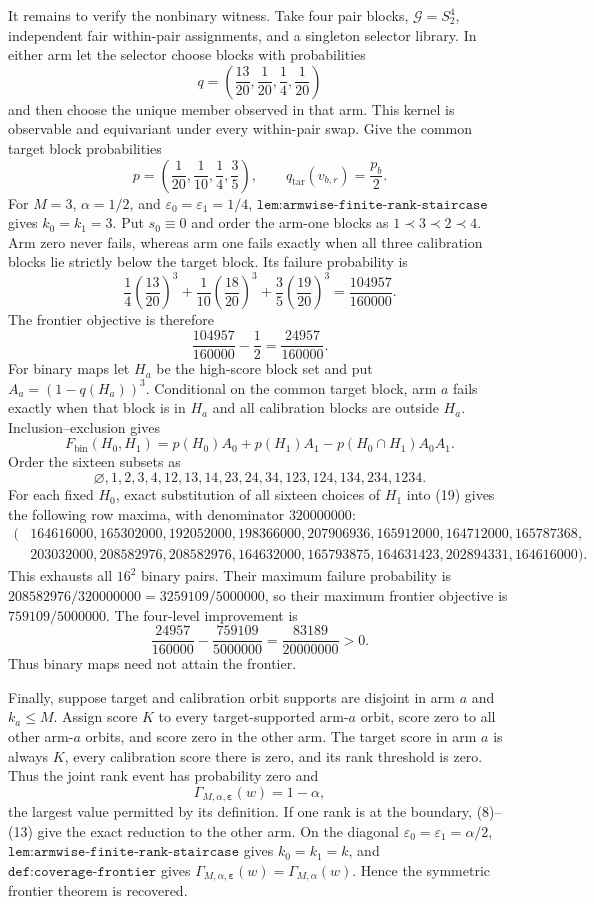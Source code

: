 It remains to verify the nonbinary witness. Take four pair blocks, \(\mathcal G=S_2^4\), independent fair within-pair assignments, and a singleton selector library. In either arm let the selector choose blocks with probabilities
\[
q=\left(\frac{13}{20},\frac1{20},\frac14,\frac1{20}\right)\tag{15}
\]
and then choose the unique member observed in that arm. This kernel is observable and equivariant under every within-pair swap. Give the common target block probabilities
\[
p=\left(\frac1{20},\frac1{10},\frac14,\frac35\right),\qquad q_{\mathrm{tar}}(v_{b,r})=\frac{p_b}{2}.\tag{16}
\]
For \(M=3\), \(\alpha=1/2\), and \(\varepsilon_0=\varepsilon_1=1/4\), \(\texttt{lem:armwise-finite-rank-staircase}\) gives \(k_0=k_1=3\). Put \(s_0\equiv0\) and order the arm-one blocks as \(1\prec3\prec2\prec4\). Arm zero never fails, whereas arm one fails exactly when all three calibration blocks lie strictly below the target block. Its failure probability is
\[
\frac14\left(\frac{13}{20}\right)^3+\frac1{10}\left(\frac{18}{20}\right)^3+\frac35\left(\frac{19}{20}\right)^3=\frac{104957}{160000}.\tag{17}
\]
The frontier objective is therefore
\[
\frac{104957}{160000}-\frac12=\frac{24957}{160000}.\tag{18}
\]
For binary maps let \(H_a\) be the high-score block set and put \(A_a=(1-q(H_a))^3\). Conditional on the common target block, arm \(a\) fails exactly when that block is in \(H_a\) and all calibration blocks are outside \(H_a\). Inclusion--exclusion gives
\[
F_{\mathrm{bin}}(H_0,H_1)=p(H_0)A_0+p(H_1)A_1-p(H_0\cap H_1)A_0A_1.\tag{19}
\]
Order the sixteen subsets as
\[
\varnothing,1,2,3,4,12,13,14,23,24,34,123,124,134,234,1234.
\]
For each fixed \(H_0\), exact substitution of all sixteen choices of \(H_1\) into (19) gives the following row maxima, with denominator \(320000000\):
\[
\begin{split}
(&164616000,165302000,192052000,198366000,207906936,165912000,164712000,165787368,\\
&203032000,208582976,208582976,164632000,165793875,164631423,202894331,164616000).
\end{split}\tag{20}
\]
This exhausts all \(16^2\) binary pairs. Their maximum failure probability is \(208582976/320000000=3259109/5000000\), so their maximum frontier objective is \(759109/5000000\). The four-level improvement is
\[
\frac{24957}{160000}-\frac{759109}{5000000}=\frac{83189}{20000000}>0.\tag{21}
\]
Thus binary maps need not attain the frontier.

Finally, suppose target and calibration orbit supports are disjoint in arm \(a\) and \(k_a\le M\). Assign score \(K\) to every target-supported arm-\(a\) orbit, score zero to all other arm-\(a\) orbits, and score zero in the other arm. The target score in arm \(a\) is always \(K\), every calibration score there is zero, and its rank threshold is zero. Thus the joint rank event has probability zero and
\[
\Gamma_{M,\alpha,\boldsymbol\varepsilon}(w)=1-\alpha,\tag{22}
\]
the largest value permitted by its definition. If one rank is at the boundary, (8)--(13) give the exact reduction to the other arm. On the diagonal \(\varepsilon_0=\varepsilon_1=\alpha/2\), \(\texttt{lem:armwise-finite-rank-staircase}\) gives \(k_0=k_1=k\), and \(\texttt{def:coverage-frontier}\) gives \(\Gamma_{M,\alpha,\boldsymbol\varepsilon}(w)=\Gamma_{M,\alpha}(w)\). Hence the symmetric frontier theorem is recovered.